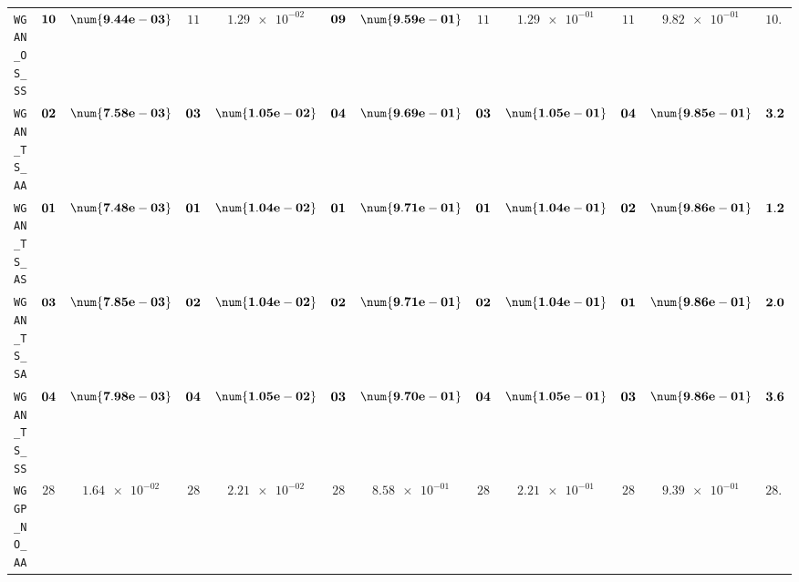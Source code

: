 \begin{xltabular}{\textwidth}{l||cC|cC|cC|cC|cC||c}
	\texttt{WGAN\_OS\_SS} & $\bf 10$ & $\bf \num{9.44e-03}$ & $ 11$ & $ \num{1.29e-02}$ & $\bf 09$ & $\bf \num{9.59e-01}$ & $ 11$ & $ \num{1.29e-01}$ & $ 11$ & $ \num{9.82e-01}$ & $ 10.4$  \\
	\texttt{WGAN\_TS\_AA} & $\bf 02$ & $\bf \num{7.58e-03}$ & $\bf 03$ & $\bf \num{1.05e-02}$ & $\bf 04$ & $\bf \num{9.69e-01}$ & $\bf 03$ & $\bf \num{1.05e-01}$ & $\bf 04$ & $\bf \num{9.85e-01}$ & $\bf 3.2$  \\
	\texttt{WGAN\_TS\_AS} & $\bf 01$ & $\bf \num{7.48e-03}$ & $\bf 01$ & $\bf \num{1.04e-02}$ & $\bf 01$ & $\bf \num{9.71e-01}$ & $\bf 01$ & $\bf \num{1.04e-01}$ & $\bf 02$ & $\bf \num{9.86e-01}$ & $\bf 1.2$  \\
	\texttt{WGAN\_TS\_SA} & $\bf 03$ & $\bf \num{7.85e-03}$ & $\bf 02$ & $\bf \num{1.04e-02}$ & $\bf 02$ & $\bf \num{9.71e-01}$ & $\bf 02$ & $\bf \num{1.04e-01}$ & $\bf 01$ & $\bf \num{9.86e-01}$ & $\bf 2.0$  \\
	\texttt{WGAN\_TS\_SS} & $\bf 04$ & $\bf \num{7.98e-03}$ & $\bf 04$ & $\bf \num{1.05e-02}$ & $\bf 03$ & $\bf \num{9.70e-01}$ & $\bf 04$ & $\bf \num{1.05e-01}$ & $\bf 03$ & $\bf \num{9.86e-01}$ & $\bf 3.6$  \\ \midrule
	\texttt{WGGP\_NO\_AA} & $ 28$ & $ \num{1.64e-02}$ & $ 28$ & $ \num{2.21e-02}$ & $ 28$ & $ \num{8.58e-01}$ & $ 28$ & $ \num{2.21e-01}$ & $ 28$ & $ \num{9.39e-01}$ & $ 28.0$  \\

\end{xltabular}
